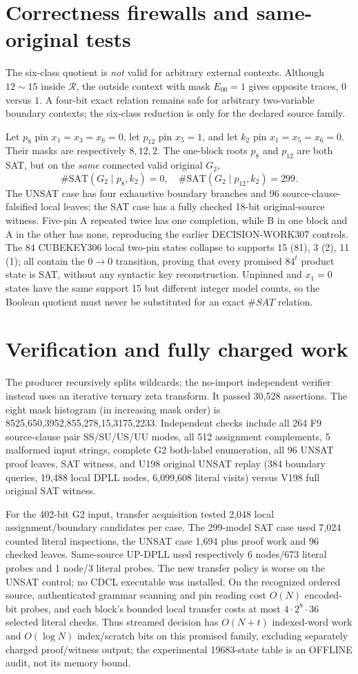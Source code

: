 \documentclass[11pt]{article}
\begin{document}
\section{Correctness firewalls and same-original tests}
The six-class quotient is \emph{not} valid for arbitrary external contexts. Although $12\sim15$ inside $\mathcal R$, the outside context with mask $E_{00}=1$ gives opposite traces, $0$ versus $1$. A four-bit exact relation remains safe for arbitrary two-variable boundary contexts; the six-class reduction is only for the declared source family.

Let $p_8$ pin $x_1=x_3=x_6=0$, let $p_{12}$ pin $x_5=1$, and let $k_2$ pin $x_1=x_5=x_6=0$. Their masks are respectively $8,12,2$. The one-block roots $p_8$ and $p_{12}$ are both SAT, but on the \emph{same} connected valid original $G_2$,
\[
\#\mathrm{SAT}(G_2\mid p_8,k_2)=0,\quad
\#\mathrm{SAT}(G_2\mid p_{12},k_2)=299.
\]
The UNSAT case has four exhaustive boundary branches and 96 source-clause-falsified local leaves; the SAT case has a fully checked 18-bit original-source witness. Five-pin A repeated twice has one completion, while B in one block and A in the other has none, reproducing the earlier DECISION-WORK307 controls. The 84 CUBEKEY306 local two-pin states collapse to supports 15 (81), 3 (2), 11 (1); all contain the $0\to0$ transition, proving that every promised $84^t$ product state is SAT, without any syntactic key reconstruction. Unpinned and $x_1=0$ states have the same support 15 but different integer model counts, so the Boolean quotient must never be substituted for an exact $\#SAT$ relation.
\section{Verification and fully charged work}
The producer recursively splits wildcards; the no-import independent verifier instead uses an iterative ternary zeta transform. It passed 30,528 assertions. The eight mask histogram (in increasing mask order) is 8525,650,3952,855,278,15,3175,2233. Independent checks include all 264 F9 source-clause pair SS/SU/US/UU modes, all 512 assignment complements, 5 malformed input strings, complete G2 both-label enumeration, all 96 UNSAT proof leaves, SAT witness, and U198 original UNSAT replay (384 boundary queries, 19,488 local DPLL nodes, 6,099,608 literal visits) versus V198 full original SAT witness.

For the 402-bit G2 input, transfer acquisition tested 2,048 local assignment/boundary candidates per case. The 299-model SAT case used 7,024 counted literal inspections, the UNSAT case 1,694 plus proof work and 96 checked leaves. Same-source UP-DPLL used respectively 6 nodes/673 literal probes and 1 node/3 literal probes. The new transfer policy is worse on the UNSAT control; no CDCL executable was installed. On the recognized ordered source, authenticated grammar scanning and pin reading cost $O(N)$ encoded-bit probes, and each block's bounded local transfer costs at most $4\cdot2^8\cdot 36$ selected literal checks. Thus streamed decision has $O(N+t)$ indexed-word work and $O(\log N)$ index/scratch bits on this promised family, excluding separately charged proof/witness output; the experimental 19683-state table is an OFFLINE audit, not its memory bound.
\end{document}
